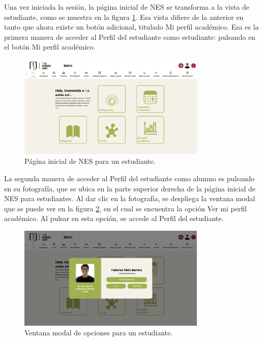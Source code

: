Una vez iniciada la sesión, la página inicial de NES se transforma a la vista de estudiante, como se muestra en la figura \ref{fig:landing_estudiante}. Esa vista difiere de la anterior en tanto que ahora existe un botón adicional, titulado Mi perfil académico. Esa es la primera manera de acceder al Perfil del estudiante como estudiante: pulsando en el botón Mi perfil académico.

\begin{figure}[H]
  \centering
  \includegraphics[width=0.8\textwidth]{img/nes/landing_estudiante.png}
  \caption{Página inicial de NES para un estudiante.}
  \label{fig:landing_estudiante}
\end{figure}

La segunda manera de acceder al Perfil del estudiante como alumno es pulsando en su fotografía, que se ubica en la parte superior derecha de la página inicial de \gls{NES} para estudiantes. Al dar clic en la fotografía, se despliega la ventana modal que se puede ver en la figura \ref{fig:menu_estudiante}, en el cual se encuentra la opción Ver mi perfil académico. Al pulsar en esta opción, se accede al Perfil del estudiante.

\begin{figure}[H]
  \centering
  \includegraphics[width=0.8\textwidth]{img/nes/menu_estudiante.png}
  \caption{Ventana modal de opciones para un estudiante.}
  \label{fig:menu_estudiante}
\end{figure}

